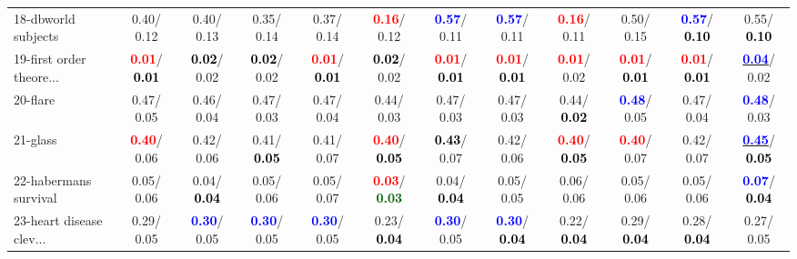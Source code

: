 \begin{table}[h]
\begin{center}
{\begin{tabular}{lc|c|c|c|c|c|c|c|c|c|c}
18-dbworld subjects &   0.40/  0.12 &   0.40/  0.13 &   0.35/  0.14 &   0.37/  0.14 & \textcolor{red}{\textbf{  0.16}}/  0.12 & \textcolor{blue}{\textbf{  0.57}}/  0.11 & \textcolor{blue}{\textbf{  0.57}}/  0.11 & \textcolor{red}{\textbf{  0.16}}/  0.11 &   0.50/  0.15 & \textcolor{blue}{\textbf{  0.57}}/\textcolor{black}{\textbf{  0.10}} &   0.55/\textcolor{black}{\textbf{  0.10}} \\
19-first order theore... & \textcolor{red}{\textbf{  0.01}}/\textcolor{black}{\textbf{  0.01}} & \textcolor{black}{\textbf{  0.02}}/  0.02 & \textcolor{black}{\textbf{  0.02}}/  0.02 & \textcolor{red}{\textbf{  0.01}}/\textcolor{black}{\textbf{  0.01}} & \textcolor{black}{\textbf{  0.02}}/  0.02 & \textcolor{red}{\textbf{  0.01}}/\textcolor{black}{\textbf{  0.01}} & \textcolor{red}{\textbf{  0.01}}/\textcolor{black}{\textbf{  0.01}} & \textcolor{red}{\textbf{  0.01}}/  0.02 & \textcolor{red}{\textbf{  0.01}}/\textcolor{black}{\textbf{  0.01}} & \textcolor{red}{\textbf{  0.01}}/\textcolor{black}{\textbf{  0.01}} & \underline{\textcolor{blue}{\textbf{  0.04}}}/  0.02 \\
20-flare &   0.47/  0.05 &   0.46/  0.04 &   0.47/  0.03 &   0.47/  0.04 &   0.44/  0.03 &   0.47/  0.03 &   0.47/  0.03 &   0.44/\textcolor{black}{\textbf{  0.02}} & \textcolor{blue}{\textbf{  0.48}}/  0.05 &   0.47/  0.04 & \textcolor{blue}{\textbf{  0.48}}/  0.03 \\
21-glass & \textcolor{red}{\textbf{  0.40}}/  0.06 &   0.42/  0.06 &   0.41/\textcolor{black}{\textbf{  0.05}} &   0.41/  0.07 & \textcolor{red}{\textbf{  0.40}}/\textcolor{black}{\textbf{  0.05}} & \textcolor{black}{\textbf{  0.43}}/  0.07 &   0.42/  0.06 & \textcolor{red}{\textbf{  0.40}}/\textcolor{black}{\textbf{  0.05}} & \textcolor{red}{\textbf{  0.40}}/  0.07 &   0.42/  0.07 & \underline{\textcolor{blue}{\textbf{  0.45}}}/\textcolor{black}{\textbf{  0.05}} \\ \hline
22-habermans survival &   0.05/  0.06 &   0.04/\textcolor{black}{\textbf{  0.04}} &   0.05/  0.06 &   0.05/  0.07 & \textcolor{red}{\textbf{  0.03}}/\textcolor{darkgreen}{\textbf{  0.03}} &   0.04/\textcolor{black}{\textbf{  0.04}} &   0.05/  0.05 &   0.06/  0.06 &   0.05/  0.06 &   0.05/  0.06 & \textcolor{blue}{\textbf{  0.07}}/\textcolor{black}{\textbf{  0.04}} \\
23-heart disease clev... &   0.29/  0.05 & \textcolor{blue}{\textbf{  0.30}}/  0.05 & \textcolor{blue}{\textbf{  0.30}}/  0.05 & \textcolor{blue}{\textbf{  0.30}}/  0.05 &   0.23/\textcolor{black}{\textbf{  0.04}} & \textcolor{blue}{\textbf{  0.30}}/  0.05 & \textcolor{blue}{\textbf{  0.30}}/\textcolor{black}{\textbf{  0.04}} &   0.22/\textcolor{black}{\textbf{  0.04}} &   0.29/\textcolor{black}{\textbf{  0.04}} &   0.28/\textcolor{black}{\textbf{  0.04}} &   0.27/  0.05 \\

\end{tabular}}
\end{center}
\end{table}
